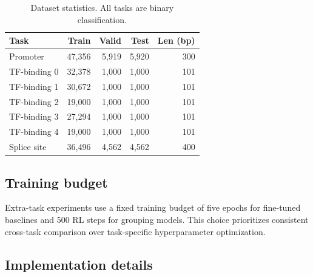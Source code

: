 \documentclass[sigconf,screen]{acmart}
\begin{document}
\begin{table}[t]
    \centering
    \caption{Dataset statistics. All tasks are binary classification.}
    \label{tab:datasets}
    \begin{tabular}{lrrrr}
        \toprule
        Task & Train & Valid & Test & Len (bp) \\
        \midrule
        Promoter      & 47{,}356 & 5{,}919 & 5{,}920 & 300 \\
        TF-binding 0  & 32{,}378 & 1{,}000 & 1{,}000 & 101 \\
        TF-binding 1  & 30{,}672 & 1{,}000 & 1{,}000 & 101 \\
        TF-binding 2  & 19{,}000 & 1{,}000 & 1{,}000 & 101 \\
        TF-binding 3  & 27{,}294 & 1{,}000 & 1{,}000 & 101 \\
        TF-binding 4  & 19{,}000 & 1{,}000 & 1{,}000 & 101 \\
        Splice site   & 36{,}496 & 4{,}562 & 4{,}562 & 400 \\
        \bottomrule
    \end{tabular}
\end{table}

\subsection{Training budget}
Extra-task experiments use a fixed training budget of five epochs for fine-tuned baselines and 500 RL steps for grouping models. This choice prioritizes consistent cross-task comparison over task-specific hyperparameter optimization.

\subsection{Implementation details}
\end{document}
